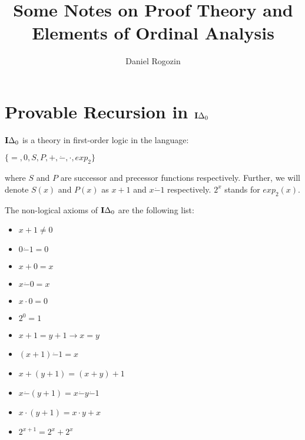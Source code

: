 \documentclass[8pt]{article}
\title{Some Notes on Proof Theory and Elements of Ordinal Analysis}
\author{Daniel Rogozin}
\date{ }
\theoremstyle{definition}
\theoremstyle{definition}
\theoremstyle{definition}
\theoremstyle{definition}
\theoremstyle{definition}
\theoremstyle{definition}
\theoremstyle{definition}
\theoremstyle{definition}
\theoremstyle{definition}
\theoremstyle{definition}
\theoremstyle{definition}
\theoremstyle{definition}
\theoremstyle{definition}
\theoremstyle{question}
\begin{document}
\maketitle

\section{Provable Recursion in ${\bf I}\Delta_0$}

${\bf I}\Delta_0$ is a theory in first-order logic in the language:
\begin{center}
  $\{ =, 0, S, P, +, \dot{-}, \cdot, exp_2 \}$
\end{center}
where $S$ and $P$ are successor and precessor functions respectively.
Further, we will denote $S(x)$ and $P(x)$ as $x + 1$ and $x \dot{-} 1$ respectively.
$2^x$ stands for $exp_2(x)$.

The non-logical axioms of ${\bf I}\Delta_0$ are the following list:

\vspace{\baselineskip}

\begin{minipage}{0.45\textwidth}
  \begin{itemize}
    \item $x + 1 \neq 0$
    \item $0 \dot{-} 1 = 0$
    \item $x + 0 = x$
    \item $x \dot{-} 0 = x$
    \item $x \cdot 0 = 0$
    \item $2^0 = 1$
  \end{itemize}
\end{minipage}%
\hfill
\begin{minipage}{0.45\textwidth}
  \begin{itemize}
    \item $x + 1 = y + 1 \to x = y$
    \item $(x + 1) \dot{-} 1 = x$
    \item $x + (y + 1) = (x + y) + 1$
    \item $x \dot{-} (y + 1) = x \dot{-} y \dot{-} 1$
    \item $x \cdot (y + 1) = x \cdot y + x$
    \item $2^{x + 1} = 2^x + 2^x$
  \end{itemize}
\end{minipage}

\vspace{\baselineskip}
\end{document}
